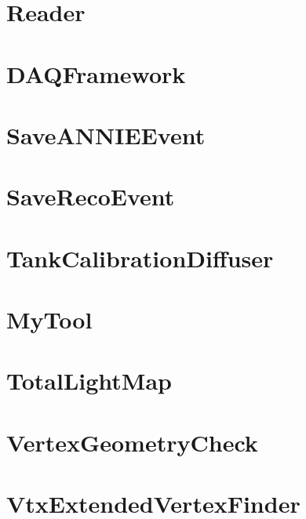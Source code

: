 \documentclass[twoside]{book}
\begin{document}
\chapter{Reader}
\label{md_UserTools_Reader_README}
\hypertarget{md_UserTools_Reader_README}{}

\chapter{D\-A\-Q\-Framework}
\label{md_UserTools_README}
\hypertarget{md_UserTools_README}{}

\chapter{Save\-A\-N\-N\-I\-E\-Event}
\label{md_UserTools_SaveANNIEEvent_README}
\hypertarget{md_UserTools_SaveANNIEEvent_README}{}

\chapter{Save\-Reco\-Event}
\label{md_UserTools_SaveRecoEvent_README}
\hypertarget{md_UserTools_SaveRecoEvent_README}{}

\chapter{Tank\-Calibration\-Diffuser}
\label{md_UserTools_TankCalibrationDiffuser_README}
\hypertarget{md_UserTools_TankCalibrationDiffuser_README}{}

\chapter{My\-Tool}
\label{md_UserTools_template_README}
\hypertarget{md_UserTools_template_README}{}

\chapter{Total\-Light\-Map}
\label{md_UserTools_TotalLightMap_README}
\hypertarget{md_UserTools_TotalLightMap_README}{}

\chapter{Vertex\-Geometry\-Check}
\label{md_UserTools_VertexGeometryCheck_README}
\hypertarget{md_UserTools_VertexGeometryCheck_README}{}

\chapter{Vtx\-Extended\-Vertex\-Finder}
\label{md_UserTools_VtxExtendedVertexFinder_README}
\hypertarget{md_UserTools_VtxExtendedVertexFinder_README}{}

\end{document}

